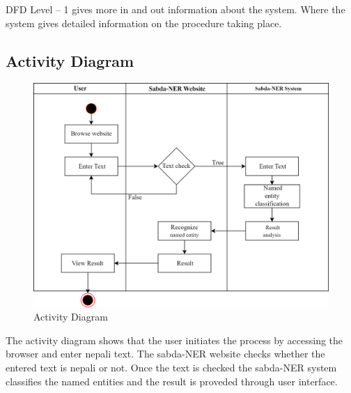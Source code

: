  
DFD Level – 1 gives more in and out information about the system. Where the system
gives detailed information on the procedure taking place.

\subsection{Activity Diagram} 
\vspace{30pt} %

  \begin{figure}[H]
\centering
\includegraphics [scale=0.9]{img/systemBlock-etc/activity sabda ner.png}
\caption[ Activity Diagram]{Activity Diagram}

\end{figure}

 
The activity diagram shows that the user initiates the process by accessing the browser and enter nepali text. The sabda-NER website checks whether the entered text is nepali or not. Once the text is checked the sabda-NER system classifies the named entities and the result is proveded through user interface.\\






